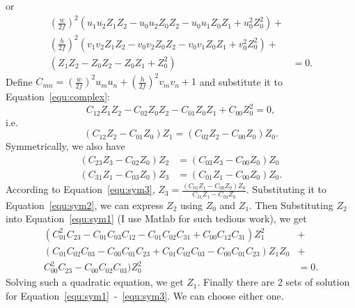 \documentclass[a4paper]{article}
\begin{document}
or
\begin{align}
(\frac{w}{2f})^2(u_1u_2Z_1Z_2-u_0u_2Z_0Z_2-u_0u_1Z_0Z_1+u_0^2Z_0^2)+ & \nonumber\\
(\frac{h}{2f})^2(v_1v_2Z_1Z_2-v_0v_2Z_0Z_2-v_0v_1Z_0Z_1+v_0^2Z_0^2)+ & \nonumber\\
(Z_1Z_2-Z_0Z_2-Z_0Z_1+Z_0^2) &=0\label{equ:complex}.
\end{align}
Define $C_{mn}=(\frac{w}{2f})^2u_mu_n+(\frac{h}{2f})^2v_mv_n+1$ and substitute it to Equation~\ref{equ:complex}:
\begin{equation}
C_{12}Z_1Z_2-C_{02}Z_0Z_2-C_{01}Z_0Z_1+C_{00}Z_0^2=0,
\end{equation}
i.e.
\begin{equation}
(C_{12}Z_2-C_{01}Z_0)Z_1=(C_{02}Z_2-C_{00}Z_0)Z_0 \label{equ:sym1}.
\end{equation}
Symmetrically, we also have
\begin{align}
(C_{23}Z_3-C_{02}Z_0)Z_2&=(C_{03}Z_3-C_{00}Z_0)Z_0 \label{equ:sym2} \\
(C_{31}Z_1-C_{03}Z_0)Z_3&=(C_{01}Z_1-C_{00}Z_0)Z_0 \label{equ:sym3}.
\end{align}
According to Equation~\ref{equ:sym3}, $Z_3=\frac{(C_{01}Z_1-C_{00}Z_0)Z_0}{C_{31}Z_1-C_{03}Z_0}$.
Substituting it to Equation~\ref{equ:sym2}, we can express $Z_2$ using $Z_0$ and $Z_1$.
Then Substituting $Z_2$ into Equation~\ref{equ:sym1} (I use Matlab for such tedious work), we get
\begin{align}
(C_{01}^2C_{23}-C_{01}C_{03}C_{12}-C_{01}C_{02}C_{31}+C_{00}C_{12}C_{31})Z_1^2 & +\nonumber\\
(C_{01}C_{02}C_{03}-C_{00}C_{01}C_{23}+C_{01}C_{02}C_{03}-C_{00}C_{01}C_{23})Z_1Z_0 & + \nonumber\\
C_{00}^2C_{23}-C_{00}C_{02}C_{03})Z_0^2&=0.
\end{align}
Solving such a quadratic equation, we get $Z_1$.
Finally there are 2 sets of solution for Equation~\ref{equ:sym1}~-~\ref{equ:sym3}.
We can choose either one.
\end{document}
